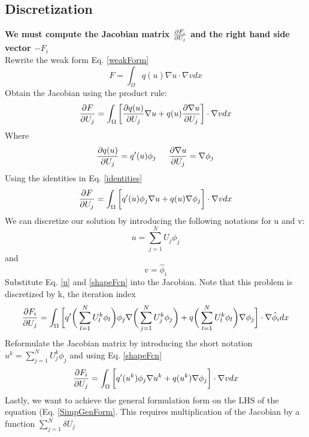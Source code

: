 \documentclass[12pt,3p]{article}
\begin{document}
\subsection{Discretization}
\textbf{We must compute the Jacobian matrix $\pdv{F_i}{U_j}$ and the right hand side vector $- F_i$} \\
Rewrite the weak form Eq. \ref{weakForm} 
\begin{equation}
F =  \int_{\Omega} q(u) \nabla u \cdot \nabla v dx 
\end{equation}
Obtain the Jacobian using the product rule: 
\begin{equation*}
\pdv{F}{U_j} = \int_{\Omega} \bigg[ \pdv{q(u)}{U_j} \nabla u + q(u) \pdv{\nabla u}{U_j} \bigg] \cdot \nabla v dx
\end{equation*}
Where
\begin{equation}\label{identities}
\pdv{q(u)}{U_j} = q'(u) \phi_j \indent \pdv{\nabla u}{U_j} = \nabla \phi_j
\end{equation}
Using the identities in Eq. \ref{identities}
\begin{equation*}
\pdv{F}{U_j} = \int_{\Omega} \bigg[ q'(u) \phi_j \nabla u + q(u) \nabla \phi_j \bigg] \cdot \nabla v dx
\end{equation*}
We can discretize our solution by introducing the following notations for u and v: 
\begin{equation}\label{u}
u = \sum_{j=1}^ N U_j \phi_j
\end{equation}
and 
\begin{equation}\label{shapeFcn}
v = \hat \phi_i
\end{equation}
Substitute Eq. \ref{u} and \ref{shapeFcn} into the Jacobian. Note that this problem is discretized by k, the iteration index
\begin{equation*}
\pdv{F_i}{U_j} = \int_{\Omega} \bigg[ q' \bigg( \sum_{l=1}^ N U_l^k \phi_l \bigg) \phi_j \nabla \bigg( \sum_{j=1}^ N U_j^k \phi_j \bigg) + q \bigg(\sum_{l=1}^ N U_l^k \phi_l \bigg) \nabla \phi_j \bigg] \cdot \nabla \hat \phi_i dx
\end{equation*}
Reformulate the Jacobian matrix by introducing the short notation $u^k = \sum_{j = 1}^N U_j^k \phi_j$ and using Eq. \ref{shapeFcn}
\begin{equation*}
\pdv{F_i}{U_j} = \int_{\Omega} \bigg[ q'(u^k) \phi_j \nabla u^k + q(u^k)  \nabla \phi_j \bigg] \cdot \nabla v dx
\end{equation*}
Lastly, we want to achieve the general formulation form on the LHS of the equation (Eq. \ref{SimpGenForm}. This requires multiplication of the Jacobian by a function $\sum_{j = 1}^N \delta U_j$ 
\end{document}
